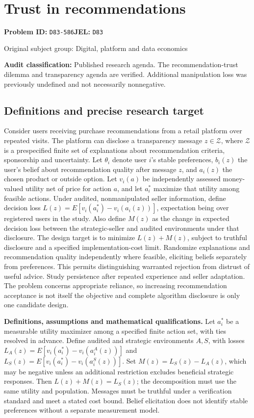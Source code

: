 \documentclass[11pt,a4paper]{article}
\begin{document}
\section*{Trust in recommendations}
\textbf{Problem ID:} \texttt{D83-586}\quad \textbf{JEL:} \texttt{D83}\par
\label{problem:OP-0404}
{\sffamily\small\color{muted}Original subject group: Digital, platform and data economics\par}
\label{definitions:problem:30007686}
\textbf{Audit classification:} Published research agenda. The recommendation-trust dilemma and transparency agenda are verified. Additional manipulation loss was previously undefined and not necessarily nonnegative.
\subsection*{Definitions and precise research target}
Consider users receiving purchase recommendations from a retail platform over repeated visits. The platform can disclose a transparency message \(z\in\mathcal Z\), where \(\mathcal Z\) is a prespecified finite set of explanations about recommendation criteria, sponsorship and uncertainty. Let \(\theta_i\) denote user \(i\)'s stable preferences, \(b_i(z)\) the user's belief about recommendation quality after message \(z\), and \(a_i(z)\) the chosen product or outside option. Let \(v_i(a)\) be independently assessed money-valued utility net of price for action \(a\), and let \(a_i^*\) maximize that utility among feasible actions. Under audited, nonmanipulated seller information, define decision loss \(L(z)=E[v_i(a_i^*)-v_i(a_i(z))]\), expectation being over registered users in the study. Also define \(M(z)\) as the change in expected decision loss between the strategic-seller and audited environments under that disclosure. The design target is to minimize \(L(z)+M(z)\), subject to truthful disclosure and a specified implementation-cost limit. Randomize explanations and recommendation quality independently where feasible, eliciting beliefs separately from preferences. This permits distinguishing warranted rejection from distrust of useful advice. Study persistence after repeated experience and seller adaptation. The problem concerns appropriate reliance, so increasing recommendation acceptance is not itself the objective and complete algorithm disclosure is only one candidate design.

\textbf{Definitions, assumptions and mathematical qualifications.} Let \(a_i^*\) be a measurable utility maximizer among a specified finite action set, with ties resolved in advance. Define audited and strategic environments \(A,S\), with losses \(L_A(z)=E[v_i(a_i^*)-v_i(a_i^A(z))]\) and \(L_S(z)=E[v_i(a_i^*)-v_i(a_i^S(z))]\). Set \(M(z)=L_S(z)-L_A(z)\), which may be negative unless an additional restriction excludes beneficial strategic responses. Then \(L(z)+M(z)=L_S(z)\); the decomposition must use the same utility and population. Messages must be truthful under a verification standard and meet a stated cost bound. Belief elicitation does not identify stable preferences without a separate measurement model.
\end{document}
